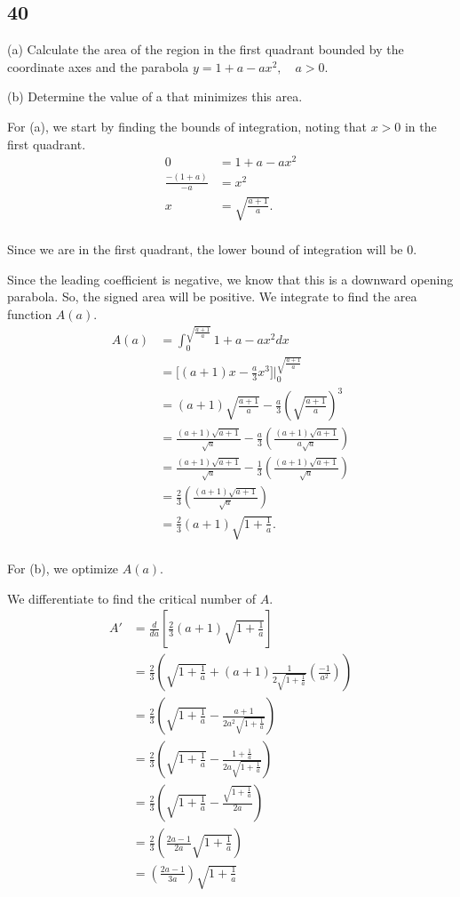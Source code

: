 \documentclass[../hw6.tex]{subfiles}
\begin{document}
\subsection*{40}
(a) Calculate the area of the region in the first quadrant
bounded by the coordinate axes and the parabola $y=1+a-ax^2, \quad a>0$.

(b) Determine the value of a that minimizes this area.


For (a), we start by finding the bounds of integration, noting that $x>0$ in the first quadrant. 
\begin{align*}
    0 &= 1+a-ax^2 \\
    \frac{-(1+a)}{-a} &= x^2 \\
    x &= \sqrt{\frac{a+1}{a}}. \\
\end{align*}

Since we are in the first quadrant, the lower bound of integration will be 0.

Since the leading coefficient is negative, we know that this is a downward opening parabola. So, the signed area will be positive. We integrate to find the area function $A(a)$.
\begin{align*}
    A(a) &= \int_{0}^{\sqrt{\frac{a+1}{a}}} 1+a-ax^2 dx \\
    &= \bigg[ (a+1)x-\frac{a}{3}x^3 \bigg] \Bigg\vert_{0}^{\sqrt{\frac{a+1}{a}}} \\
    &= (a+1)\sqrt{\frac{a+1}{a}} - \frac{a}{3}{\left( \sqrt{\frac{a+1}{a}} \right)}^3 \\
    &= \frac{(a+1)\sqrt{a+1}}{\sqrt{a}} - \frac{a}{3} \left( \frac{(a+1)\sqrt{a+1}}{a\sqrt{a}} \right) \\
    &= \frac{(a+1)\sqrt{a+1}}{\sqrt{a}} - \frac{1}{3} \left( \frac{(a+1)\sqrt{a+1}}{\sqrt{a}} \right) \\
    &= \frac{2}{3} \left( \frac{(a+1)\sqrt{a+1}}{\sqrt{a}} \right) \\
    &= \frac{2}{3} (a+1)\sqrt{1+\frac{1}{a}}. \\
\end{align*}

For (b), we optimize $A(a)$.

We differentiate to find the critical number of $A$.
\begin{align*}
    A' &= \frac{d}{da} \left[ \frac{2}{3} (a+1)\sqrt{1+\frac{1}{a}} \right] \\
    &= \frac{2}{3} \left( \sqrt{1+\frac{1}{a}} + (a+1) \frac{1}{2\sqrt{1+\frac{1}{a}}} \left( \frac{-1}{a^2} \right) \right) \\
    &= \frac{2}{3} \left( \sqrt{1+\frac{1}{a}} - \frac{a+1}{2a^2\sqrt{1+\frac{1}{a}}} \right) \\
    &= \frac{2}{3} \left( \sqrt{1+\frac{1}{a}} - \frac{1+\frac{1}{a}}{2a\sqrt{1+\frac{1}{a}}} \right) \\
    &= \frac{2}{3} \left( \sqrt{1+\frac{1}{a}} - \frac{\sqrt{1+\frac{1}{a}}}{2a} \right) \\
    &= \frac{2}{3} \left( \frac{2a-1}{2a} \sqrt{1+\frac{1}{a}} \right) \\
    &= \left( \frac{2a-1}{3a} \right) \sqrt{1+\frac{1}{a}} \\
\end{align*}
\end{document}
